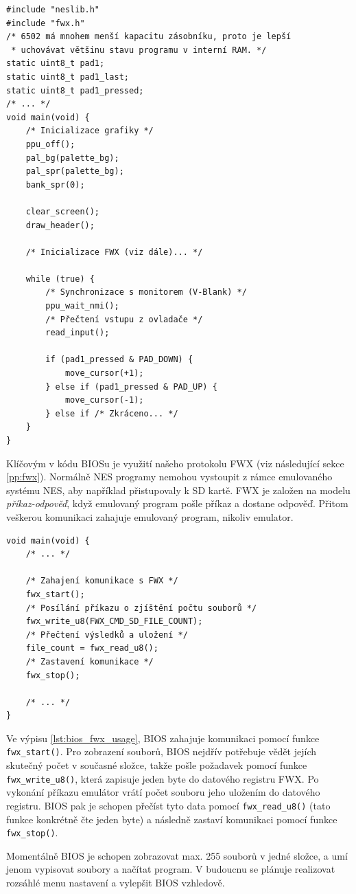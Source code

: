 \begin{listing}[htbp]
\begin{verbatim}
#include "neslib.h"
#include "fwx.h"
/* 6502 má mnohem menší kapacitu zásobníku, proto je lepší
 * uchovávat většinu stavu programu v interní RAM. */
static uint8_t pad1;
static uint8_t pad1_last;
static uint8_t pad1_pressed;
/* ... */
void main(void) {
    /* Inicializace grafiky */
    ppu_off();
    pal_bg(palette_bg);
    pal_spr(palette_bg);
    bank_spr(0);

    clear_screen();
    draw_header();

    /* Inicializace FWX (viz dále)... */

    while (true) {
        /* Synchronizace s monitorem (V-Blank) */
        ppu_wait_nmi();
        /* Přečtení vstupu z ovladače */
        read_input();

        if (pad1_pressed & PAD_DOWN) {
            move_cursor(+1);
        } else if (pad1_pressed & PAD_UP) {
            move_cursor(-1);
        } else if /* Zkráceno... */
    }
}
\end{verbatim}
\caption{Struktura kódu BIOS (zkráceno)}
\label{lst:bios_structure}
\end{listing}

Klíčovým v kódu BIOSu je využití našeho protokolu FWX (viz následující sekce \ref{pp:fwx}). Normálně
NES programy nemohou vystoupit z rámce emulovaného systému NES, aby například přistupovaly k SD kartě. FWX
je založen na modelu \emph{příkaz-odpověď}, když emulovaný program pošle příkaz a dostane odpověď.
Přitom veškerou komunikaci zahajuje emulovaný program, nikoliv emulator.

\begin{listing}[htbp]
\begin{verbatim}
void main(void) {
    /* ... */

    /* Zahajení komunikace s FWX */
    fwx_start();
    /* Posílání příkazu o zjíštění počtu souborů */
    fwx_write_u8(FWX_CMD_SD_FILE_COUNT);
    /* Přečtení výsledků a uložení */
    file_count = fwx_read_u8();
    /* Zastavení komunikace */
    fwx_stop();

    /* ... */
}
\end{verbatim}
\caption{Příklad využití komunikačního rozhraní FWX v kódu BIOSu.}
\label{lst:bios_fwx_usage}
\end{listing}

Ve výpisu \ref{lst:bios_fwx_usage}, BIOS zahajuje komunikaci pomocí funkce \texttt{fwx\_start()}.
Pro zobrazení souborů, BIOS nejdřív potřebuje vědět jejích skutečný počet v současné složce, takže
pošle požadavek pomocí funkce \texttt{fwx\_write\_u8()}, která zapisuje jeden byte do datového
registru FWX. Po vykonání příkazu emulátor vrátí počet souboru jeho uložením do datového registru.
BIOS pak je schopen přečíst tyto data pomocí \texttt{fwx\_read\_u8()} (tato funkce konkrétně čte
jeden byte) a následně zastaví komunikaci pomocí funkce \texttt{fwx\_stop()}.

Momentálně BIOS je schopen zobrazovat max. 255 souborů v jedné složce, a umí jenom vypisovat
soubory a načítat program. V budoucnu se plánuje realizovat rozsáhlé menu nastavení a vylepšit BIOS
vzhledově.
